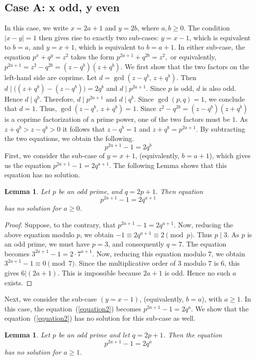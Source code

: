\documentclass[reqno,12pt]{amsart}
\newtheorem{lemma}[theorem]{Lemma}
\theoremstyle{definition}
\begin{document}
\subsection{Case A: x odd, y even}
In this case, we write $x=2a+1$ and $y=2b$, where $a,b\ge0$. The condition \(|x-y|=1\) then gives rise to exactly two sub-cases: $y=x-1$, which is equivalent to $b=a$, and $y=x+1$, which is equivalent to $b=a+1$. 
In either sub-case, the equation $p^x+q^y=z^2$ takes the form $p^{2a+1}+q^{2b}=z^2,$ or equivalently, $p^{2a+1}=z^2-q^{2b}=(z-q^b)(z+q^b)$. We first show that the two factors on the left-hand side are coprime. 
Let $d=\gcd(z-q^b,\,z+q^b)$. Then $d\mid\bigl((z+q^b)-(z-q^b)\bigr)=2q^b$ and $d\mid p^{2a+1}$. 
Since $p$ is odd, $d$ is also odd. Hence $d\mid q^b$. Therefore,
$d\mid p^{2a+1} \,\, \text{and} \,\, d\mid q^b$. Since $\gcd(p,q)=1$, we conclude that $d=1$. 
Thus, $\gcd(z-q^b,\,z+q^b)=1$. Since $z^2-q^{2b}=(z-q^b)(z+q^b)$ is a coprime factorization of a prime power, one of the two factors must be $1$.
As $z+q^b > z-q^b >0$ it follows that $z-q^b=1$ and $z+q^b=p^{2a+1}$. 
By subtracting the two equations, we obtain the following. 
\begin{equation}\label{equation2}
 p^{2a+1}-1=2q^b   
\end{equation}
First, we consider the sub-case of $y=x+1$, (equivalently, $b=a+1$), which gives us the equation $p^{2a+1}-1=2q^{a+1}$. The following Lemma shows that this equation has no solution.
\begin{lemma} \label{lemma1}
\normalfont Let $p$ be an odd prime, and $q=2p+1$. Then equation 
\begin{equation*}
p^{2a+1}-1=2q^{a+1}  
\end{equation*}
 has no solution for $a  \geq 0$.
\end{lemma}
\begin{proof}
Suppose, to the contrary, that $p^{2a+1}-1=2q^{a+1}$. Now, reducing the above equation modulo $p$, we obtain $-1\equiv 2q^{a+1} \equiv 2 \pmod p$. Thus $p\mid3$. 
As $p$ is an odd prime, we must have $p=3$, and consequently $q=7$. The equation becomes $3^{2a+1}-1=2\cdot7^{a+1}$. 
Now, reducing this equation modulo $7$, we obtain $3^{2a+1}-1 \equiv 0 \pmod 7$.
Since the multiplicative order of $3$ modulo $7$ is $6$, this gives $6 | (2a+1)$. This is impossible because $2a+1$ is odd. Hence no such $a$ exists.
\end{proof}
Next, we consider the sub-case $(y=x-1)$, (equivalently, $b=a$), with $a \ge 1$.
In this case, the equation~(\ref{equation2}) becomes $p^{2a+1}-1=2q^{a}$.
We show that the equation~(\ref{equation2}) has no solution for this sub-case as well.
\begin{lemma} \label{lemma2}
\normalfont
Let $p$ be an odd prime and let $q=2p+1$. Then the equation
\begin{equation*}
 p^{2a+1}-1=2q^a   
\end{equation*}
has no solution for $a \ge 1$.    
\end{lemma}
\end{document}
